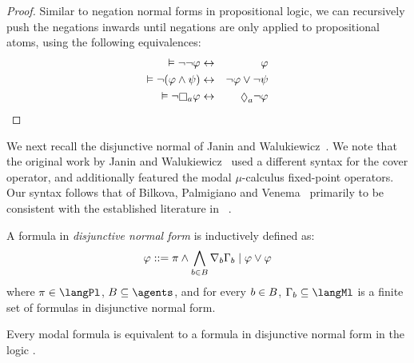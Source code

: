 \begin{proof}
Similar to negation normal forms in propositional logic, we can recursively push the negations inwards until negations are only applied to propositional atoms, using the following equivalences:
\begin{eqnarray*}
    \entails \lnot \lnot \phi &\iff& \phi\\
    \entails \lnot (\phi \land \psi) &\iff& \lnot \phi \lor \lnot \psi\\
    \entails \lnot \necessaryA \phi &\iff& \possibleA \lnot \phi
\end{eqnarray*}
\end{proof}

We next recall the disjunctive normal of Janin and Walukiewicz~\cite{janin:1995}.
We note that the original work by Janin and Walukiewicz~\cite{janin:1995} used a different syntax for the cover operator, and additionally featured the modal $\mu$-calculus fixed-point operators.
Our syntax follows that of Bilkova, Palmigiano and Venema~\cite{bilkova:2008} primarily to be consistent with the established literature in \logicRml{}~\cite{vanditmarsch:2009,vanditmarsch:2010}.

\begin{definition}
A formula in {\em disjunctive normal form} is inductively defined as:
$$
\varphi ::= \pi \land \bigwedge_{b \in B} \nabla_{b} \Gamma_b \mid \varphi \lor \varphi
$$
where $\pi \in \langPl$, $\agentsB \subseteq \agents$, and for every $b \in B$, $\Gamma_\agentB \subseteq \langMl$ is a finite set of formulas in disjunctive normal form.
\end{definition}

\begin{lemma}\label{dnf-equivalent}
Every modal formula is equivalent to a formula in disjunctive normal form in the logic \logicK{}.
\end{lemma}

